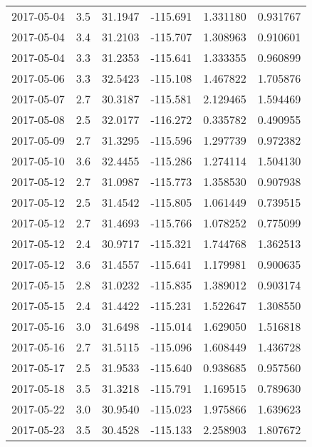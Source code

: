 \begin{tabular}{lrrrrr}
2017-05-04 &       3.5 &  31.1947 &  -115.691 &         1.331180 &         0.931767 \\
2017-05-04 &       3.4 &  31.2103 &  -115.707 &         1.308963 &         0.910601 \\
2017-05-04 &       3.3 &  31.2353 &  -115.641 &         1.333355 &         0.960899 \\
2017-05-06 &       3.3 &  32.5423 &  -115.108 &         1.467822 &         1.705876 \\
2017-05-07 &       2.7 &  30.3187 &  -115.581 &         2.129465 &         1.594469 \\
2017-05-08 &       2.5 &  32.0177 &  -116.272 &         0.335782 &         0.490955 \\
2017-05-09 &       2.7 &  31.3295 &  -115.596 &         1.297739 &         0.972382 \\
2017-05-10 &       3.6 &  32.4455 &  -115.286 &         1.274114 &         1.504130 \\
2017-05-12 &       2.7 &  31.0987 &  -115.773 &         1.358530 &         0.907938 \\
2017-05-12 &       2.5 &  31.4542 &  -115.805 &         1.061449 &         0.739515 \\
2017-05-12 &       2.7 &  31.4693 &  -115.766 &         1.078252 &         0.775099 \\
2017-05-12 &       2.4 &  30.9717 &  -115.321 &         1.744768 &         1.362513 \\
2017-05-12 &       3.6 &  31.4557 &  -115.641 &         1.179981 &         0.900635 \\
2017-05-15 &       2.8 &  31.0232 &  -115.835 &         1.389012 &         0.903174 \\
2017-05-15 &       2.4 &  31.4422 &  -115.231 &         1.522647 &         1.308550 \\
2017-05-16 &       3.0 &  31.6498 &  -115.014 &         1.629050 &         1.516818 \\
2017-05-16 &       2.7 &  31.5115 &  -115.096 &         1.608449 &         1.436728 \\
2017-05-17 &       2.5 &  31.9533 &  -115.640 &         0.938685 &         0.957560 \\
2017-05-18 &       3.5 &  31.3218 &  -115.791 &         1.169515 &         0.789630 \\
2017-05-22 &       3.0 &  30.9540 &  -115.023 &         1.975866 &         1.639623 \\
2017-05-23 &       3.5 &  30.4528 &  -115.133 &         2.258903 &         1.807672 \\

\end{tabular}
